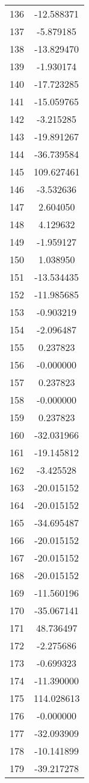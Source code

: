 \documentclass[12pt]{article}
\begin{document}
\begin{longtable}{@{}cc@{}}
136 & -12.588371 \\
137 & -5.879185 \\
138 & -13.829470 \\
139 & -1.930174 \\
140 & -17.723285 \\
141 & -15.059765 \\
142 & -3.215285 \\
143 & -19.891267 \\
144 & -36.739584 \\
145 & 109.627461 \\
146 & -3.532636 \\
147 & 2.604050 \\
148 & 4.129632 \\
149 & -1.959127 \\
150 & 1.038950 \\
151 & -13.534435 \\
152 & -11.985685 \\
153 & -0.903219 \\
154 & -2.096487 \\
155 & 0.237823 \\
156 & -0.000000 \\
157 & 0.237823 \\
158 & -0.000000 \\
159 & 0.237823 \\
160 & -32.031966 \\
161 & -19.145812 \\
162 & -3.425528 \\
163 & -20.015152 \\
164 & -20.015152 \\
165 & -34.695487 \\
166 & -20.015152 \\
167 & -20.015152 \\
168 & -20.015152 \\
169 & -11.560196 \\
170 & -35.067141 \\
171 & 48.736497 \\
172 & -2.275686 \\
173 & -0.699323 \\
174 & -11.390000 \\
175 & 114.028613 \\
176 & -0.000000 \\
177 & -32.093909 \\
178 & -10.141899 \\
179 & -39.217278 \\

\end{longtable}
\end{document}
